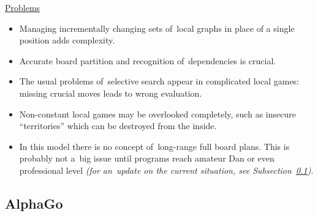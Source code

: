 \underline{Problems}
\begin{itemize}[-]
  \item Managing incrementally changing sets of~local graphs in place of a single position adds complexity.
  \item Accurate board partition and recognition of~dependencies is crucial.
  \item The usual problems of~selective search appear in complicated local games:
    missing crucial moves leads to wrong evaluation.
  \item Non-constant local games may be overlooked completely, such as insecure ``territories'' which can be destroyed from the inside.
  \item In this model there is no concept of~long-range full board plans.
    This is probably not a~big issue until programs reach amateur Dan or even professional level \textit{(for an~update on the current situation, see Subsection~\ref{ssec:AlphaGo})}.
\end{itemize}

\subsection{AlphaGo}
\label{ssec:AlphaGo}
\todo
